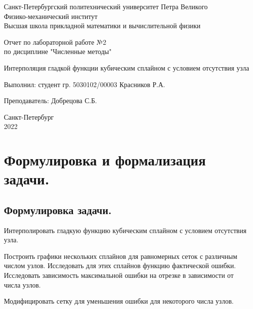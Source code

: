 \documentclass[a4paper, 12pt]{article}
\begin{document}
	\begin{titlepage}
		\begin{center}
			Санкт-Петербургский политехнический университет Петра Великого \\ Физико-механический институт \\ Высшая школа прикладной математики и вычислительной физики
		\end{center}
		\vspace{10em}
		\begin{center}
			\Large Отчет по лабораторной работе №2 \\ по дисциплине "Численные методы"
		\end{center}
		\vspace{1em}
		\begin{center}
			\Huge Интерполяция гладкой функции кубическим сплайном с условием отсутствия узла
		\end{center}
		\vspace{15em}
		{\Large 
			
			Выполнил: студент гр. 5030102/00003 Красников Р.А.
			\vspace{1em}
			
			Преподаватель: Добрецова С.Б.}
		\vspace{\fill}
		\begin{center}
			Санкт-Петербург \\ 2022
		\end{center}
	\end{titlepage}
	\newpage
	
	\section{Формулировка и формализация задачи.}
	
	\subsection{Формулировка задачи.}
	
	Интерполировать гладкую функцию кубическим сплайном с условием отсутствия узла.
	
	Построить графики нескольких сплайнов для равномерных сеток с различным числом узлов. Исследовать для этих сплайнов функцию фактической ошибки. Исследовать зависимость максимальной ошибки на отрезке в зависимости от числа узлов.
	
	Модифицировать сетку для уменьшения ошибки для некоторого числа узлов.
	
\end{document}
